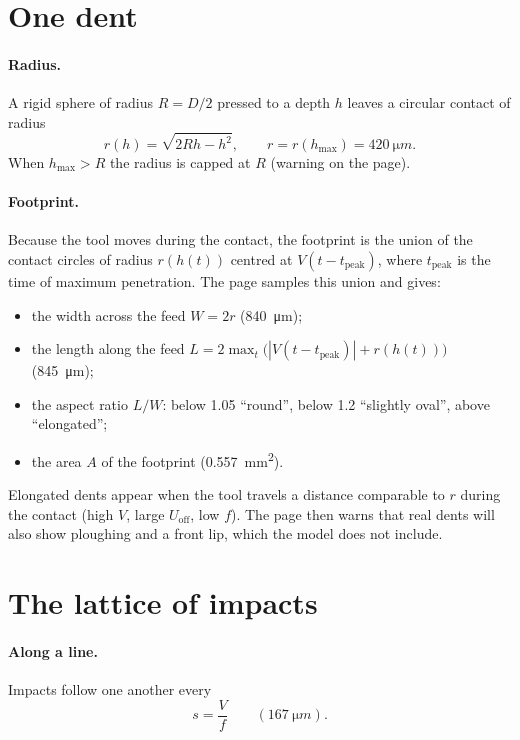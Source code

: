 \documentclass[11pt,a4paper]{article}
\begin{document}
\section{One dent}\label{sec:dent}

\paragraph{Radius.} A rigid sphere of radius $R=D/2$ pressed to a depth $h$ leaves a circular contact of radius
\begin{equation}
r(h)=\sqrt{2Rh-h^2},\qquad r=r(h_\mathrm{max})=\SI{420}{\micro m}.
\end{equation}
When $h_\mathrm{max}>R$ the radius is capped at $R$ (warning on the page).

\paragraph{Footprint.} Because the tool moves during the contact, the footprint is the union of the contact circles of radius $r(h(t))$ centred at $V(t-t_\mathrm{peak})$, where $t_\mathrm{peak}$ is the time of maximum penetration. The page samples this union and gives:
\begin{itemize}[nosep]
\item the width across the feed $W=2r$ (\SI{840}{\micro m});
\item the length along the feed $L=2\max_t\bigl(|V(t-t_\mathrm{peak})|+r(h(t))\bigr)$ (\SI{845}{\micro m});
\item the aspect ratio $L/W$: below 1.05 ``round'', below 1.2 ``slightly oval'', above ``elongated'';
\item the area $A$ of the footprint (\SI{0.557}{mm^2}).
\end{itemize}
Elongated dents appear when the tool travels a distance comparable to $r$ during the contact (high $V$, large $U_\mathrm{off}$, low $f$). The page then warns that real dents will also show ploughing and a front lip, which the model does not include.

\section{The lattice of impacts}\label{sec:lattice}

\paragraph{Along a line.} Impacts follow one another every
\begin{equation}
s=\frac{V}{f}\qquad(\SI{167}{\micro m}).
\end{equation}
\end{document}
